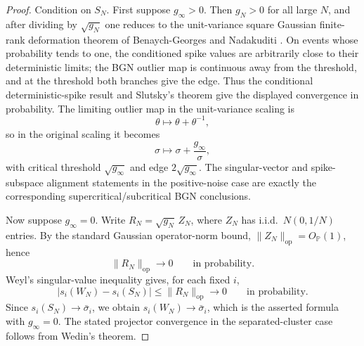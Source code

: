 \documentclass[11pt]{article}
\theoremstyle{plain}
\theoremstyle{definition}
\theoremstyle{remark}
\newcommand{\PP}{\mathbb{P}}
\newcommand{\op}{\mathrm{op}}
\newcommand{\1}{\mathbf{1}}
\begin{document}
\begin{proof}
Condition on \(S_N\). First suppose \(g_\infty>0\). Then \(g_N>0\) for all large \(N\), and after dividing by \(\sqrt{g_N}\) one reduces to the unit-variance square Gaussian finite-rank deformation theorem of Benaych-Georges and Nadakuditi \cite{benaych2012singular}. On events whose probability tends to one, the conditioned spike values are arbitrarily close to their deterministic limits; the BGN outlier map is continuous away from the threshold, and at the threshold both branches give the edge. Thus the conditional deterministic-spike result and Slutsky's theorem give the displayed convergence in probability. The limiting outlier map in the unit-variance scaling is
\[
\theta\mapsto \theta+\theta^{-1},
\]
so in the original scaling it becomes
\[
\sigma\mapsto \sigma+\frac{g_\infty}{\sigma},
\]
with critical threshold \(\sqrt{g_\infty}\) and edge \(2\sqrt{g_\infty}\). The singular-vector and spike-subspace alignment statements in the positive-noise case are exactly the corresponding supercritical/subcritical BGN conclusions.

Now suppose \(g_\infty=0\). Write \(R_N=\sqrt{g_N}\,Z_N\), where \(Z_N\) has i.i.d.\ \(N(0,1/N)\) entries. By the standard Gaussian operator-norm bound, \(\|Z_N\|_{\op}=O_{\PP}(1)\), hence
\[
\|R_N\|_{\op}\to0
\qquad\text{in probability}.
\]
Weyl's singular-value inequality gives, for each fixed \(i\),
\[
|s_i(W_N)-s_i(S_N)|\le \|R_N\|_{\op}\to0
\qquad\text{in probability}.
\]
Since \(s_i(S_N)\to\bar\sigma_i\), we obtain \(s_i(W_N)\to\bar\sigma_i\), which is the asserted formula with \(g_\infty=0\). The stated projector convergence in the separated-cluster case follows from Wedin's theorem.
\end{proof}
\end{document}
